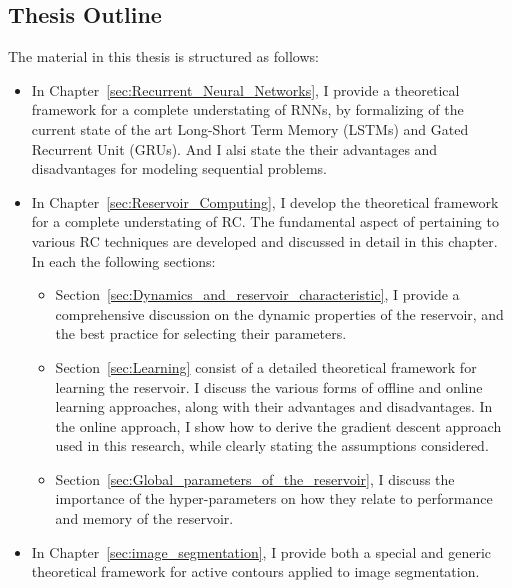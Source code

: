 \documentclass{WitsPhysicsReport}
\begin{document}
\subsection{Thesis Outline}
\label{sec: outline_of_thesis}
The material in this thesis is structured as follows:
\begin{itemize}

  \item In Chapter~\ref{sec:Recurrent_Neural_Networks}, I provide a theoretical framework for a complete understating of RNNs, by formalizing of the current state of the art Long-Short Term Memory (LSTMs) and Gated Recurrent Unit (GRUs). And I alsi state the their advantages and disadvantages for modeling sequential problems.
    
    \item In Chapter~\ref{sec:Reservoir_Computing}, I develop the theoretical framework for a complete understating of RC. The fundamental aspect of pertaining to various RC techniques are developed and discussed in detail in this chapter.  In each the following sections:
    \begin{itemize}
    \item  Section~\ref{sec:Dynamics_and_reservoir_characteristic}, I provide a comprehensive discussion on the dynamic properties of the reservoir, and the best practice for selecting their parameters.
    
    \item Section~\ref{sec:Learning} consist of a detailed theoretical framework for learning the reservoir. I discuss the various forms of offline and online learning approaches, along with their advantages and disadvantages. In the online approach, I show how to derive the gradient descent approach used in this research, while clearly stating the assumptions considered. 
    
    \item Section~\ref{sec:Global_parameters_of_the_reservoir}, I discuss the importance of the hyper-parameters on how they relate to performance and memory of the reservoir.

    \end{itemize}

    
    \item In Chapter~\ref{sec:image_segmentation},  I provide both a special and generic theoretical framework for active contours applied to image segmentation.
    

\end{itemize}
\end{document}

